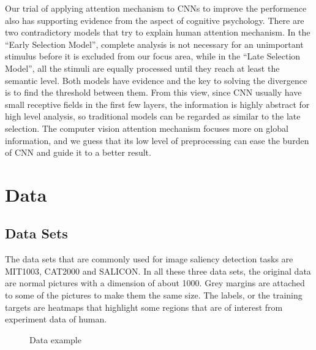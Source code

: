 \documentclass[12pt]{article}
\begin{document}
Our trial of applying attention mechanism to CNNs to improve the performence also has supporting evidence from the aspect of cognitive psychology. There are two contradictory models that try to explain human attention mechanism\cite{gazzaniga2006cognitive}. 
In the “Early Selection Model”, complete analysis is not necessary for an unimportant stimulus before it is excluded from our focus area, while in the “Late Selection Model”, all the stimuli are equally processed until they reach at least the semantic level. 
Both models have evidence and the key to solving the divergence is to find the threshold between them. From this view, since CNN usually have small receptive fields in the first few layers, the information is highly abstract for high level analysis, so traditional models can be regarded as similar to the late selection. 
The computer vision attention mechanism focuses more on global information, and we guess that its low level of preprocessing can ease the burden of CNN and guide it to a better result.

\section{Data}
\subsection{Data Sets}

The data sets that are commonly used for image saliency detection tasks are MIT1003\cite{judd2012benchmark}, CAT2000\cite{borji2015cat2000} and SALICON\cite{jiang2015salicon}.
In all these three data sets, the original data are normal pictures with a dimension of about 1000. Grey margins are attached to some of the pictures to make them the same size. 
The labels, or the training targets are heatmaps that highlight some regions that are of interest from experiment data of human.
\begin{figure}
    \centering
    \hspace{5mm}
    \caption{Data example}
\end{figure}
\end{document}

